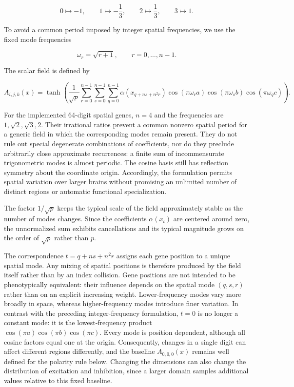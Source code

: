 \documentclass[12pt,a4paper]{article}
\begin{document}
	$$0\mapsto-1,\qquad 1\mapsto-\frac{1}{3},\qquad 2\mapsto\frac{1}{3},\qquad 3\mapsto1.$$

	To avoid a common period imposed by integer spatial frequencies, we use the fixed mode frequencies

	$$\omega_r=\sqrt{r+1},\qquad r=0,\ldots,n-1.$$

	The scalar field is defined by

	\begin{equation}
	A_{i,j,k}(x)=\tanh\left(\frac{1}{\sqrt{p}}\sum_{r=0}^{n-1}\sum_{s=0}^{n-1}\sum_{q=0}^{n-1}\alpha\!\left(x_{q+ns+n^2r}\right)\cos(\pi\omega_r a)\cos(\pi\omega_s b)\cos(\pi\omega_q c)\right).
	\label{A}
	\end{equation}

	For the implemented 64-digit spatial genes, $n=4$ and the frequencies are $1,\sqrt{2},\sqrt{3},2$. Their irrational ratios prevent a common nonzero spatial period for a generic field in which the corresponding modes remain present. They do not rule out special degenerate combinations of coefficients, nor do they preclude arbitrarily close approximate recurrences: a finite sum of incommensurate trigonometric modes is almost periodic. The cosine basis still has reflection symmetry about the coordinate origin. Accordingly, the formulation permits spatial variation over larger brains without promising an unlimited number of distinct regions or automatic functional specialization.
	
	The factor $1/\sqrt{p}$ keeps the typical scale of the field approximately stable as the number of modes changes. Since the coefficients $\alpha(x_t)$ are centered around zero, the unnormalized sum exhibits cancellations and its typical magnitude grows on the order of $\sqrt{p}$ rather than $p$.
	
	The correspondence $t=q+ns+n^2r$ assigns each gene position to a unique spatial mode. Any mixing of spatial positions is therefore produced by the field itself rather than by an index collision. Gene positions are not intended to be phenotypically equivalent: their influence depends on the spatial mode $(q,s,r)$ rather than on an explicit increasing weight. Lower-frequency modes vary more broadly in space, whereas higher-frequency modes introduce finer variation. In contrast with the preceding integer-frequency formulation, $t=0$ is no longer a constant mode: it is the lowest-frequency product $\cos(\pi a)\cos(\pi b)\cos(\pi c)$. Every mode is position dependent, although all cosine factors equal one at the origin. Consequently, changes in a single digit can affect different regions differently, and the baseline $A_{0,0,0}(x)$ remains well defined for the polarity rule below. Changing the dimensions can also change the distribution of excitation and inhibition, since a larger domain samples additional values relative to this fixed baseline.
	
\end{document}
